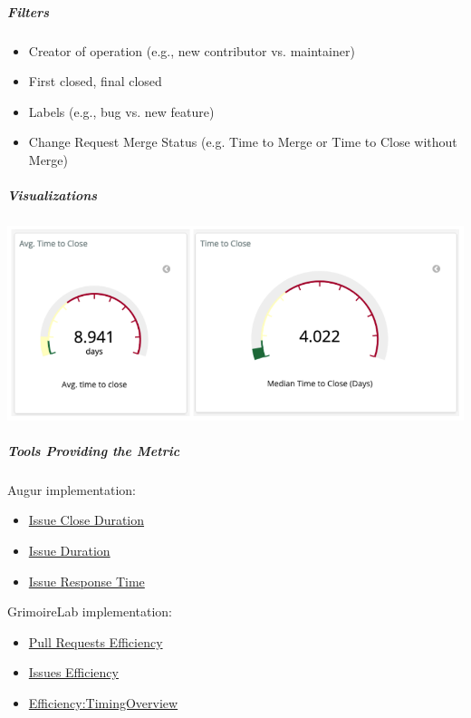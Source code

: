 \hypertarget{filters}{%
\subparagraph{Filters}\label{filters}}

\begin{itemize}
\tightlist
\item
  Creator of operation (e.g., new contributor vs. maintainer)
\item
  First closed, final closed
\item
  Labels (e.g., bug vs. new feature)
\item
  Change Request Merge Status (e.g. Time to Merge or Time to Close
  without Merge)
\end{itemize}

\hypertarget{visualizations}{%
\subparagraph{Visualizations}\label{visualizations}}

\includegraphics{images/time-to-close_1.png}

\hypertarget{tools-providing-the-metric}{%
\subparagraph{Tools Providing the
Metric}\label{tools-providing-the-metric}}

Augur implementation:

\begin{itemize}
\tightlist
\item
  \href{http://augur.osshealth.io/api_docs/\#api-Evolution-Closed_Issue_Resolution_Duration(Repo)}{Issue
  Close Duration}
\item
  \href{http://augur.osshealth.io/api_docs/\#api-Evolution-issue-duration-repo}{Issue
  Duration}
\item
  \href{http://augur.osshealth.io/api_docs/\#api-Evolution-Issue_Response_Time(Repo)}{Issue
  Response Time}
\end{itemize}

GrimoireLab implementation:

\begin{itemize}
\tightlist
\item
  \href{https://chaoss.github.io/grimoirelab-sigils/panels/github-pullrequests-efficiency/}{Pull
  Requests Efficiency}
\item
  \href{https://chaoss.github.io/grimoirelab-sigils/panels/github-issues-efficiency/}{Issues
  Efficiency}
\item
  \href{https://chaoss.github.io/grimoirelab-sigils/panels/efficiency-timing-overview/}{Efficiency:TimingOverview}
\end{itemize}

